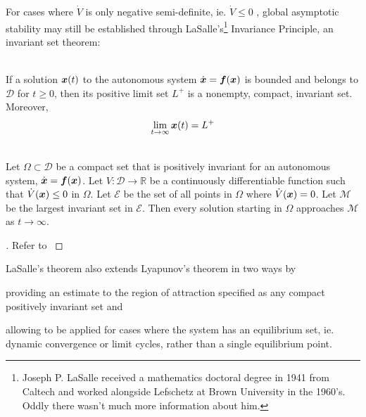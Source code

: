 \documentclass[12pt]{ucthesis}
\begin{document}
For cases where $\dot{V}$ is only negative semi-definite, ie. $\dot{V}\leq 0$ , global asymptotic stability may still be established through LaSalle's\footnote{Joseph P. LaSalle received a mathematics doctoral degree in 1941 from Caltech and worked alongside Lefschetz at Brown University in the 1960's. Oddly there wasn't much more information about him.} Invariance Principle, an invariant set theorem: 

\begin{lem} \alignright \citet[Lem. 3.1]{Khalil1996}\\
	If a solution $\boldsymbol{x}(t)$ to the autonomous system $\dot{\boldsymbol{x}} =  \boldsymbol{f}(\boldsymbol{x})$ is bounded and belongs to $\mathcal{D}$ for $t \geq 0$, then its positive limit set ${L}^+$ is a nonempty, compact, invariant set. Moreover,
	\begin{equation}
		\lim_{t \rightarrow \infty} \boldsymbol{x}(t) = {L}^+
		\label{lem: limit_set_conv}
	\end{equation}
\end{lem}

\begin{thm} \alignright \citet[Thm. 3.4]{Khalil1996} \label{thm: lasalle}\\
	Let $\Omega \subset \mathcal{D}$ be a compact set that is positively invariant for an autonomous system, $\dot{\boldsymbol{x}} =  \boldsymbol{f}(\boldsymbol{x})$. Let $V: \mathcal{D} \rightarrow \mathbb{R}$ be a continuously differentiable function such that $\dot{V}(\boldsymbol{x}) \leq 0$ in $\Omega$. Let $\mathcal{E}$ be the set of all points in $\Omega$ where $\dot{V}(\boldsymbol{x})=0$. Let $\mathcal{M}$ be the largest invariant set in $\mathcal{E}$. Then every solution starting in $\Omega$ approaches $\mathcal{M}$ as $t \rightarrow \infty$.
\end{thm}

\begin{proof}[]
	Refer to \citet[Pg. 115]{Khalil1996}
\end{proof}

LaSalle's theorem also extends Lyapunov's theorem in two ways by \begin{inparaenum} \item{providing an estimate to the region of attraction specified as any compact positively invariant set and} \item{allowing  to be applied for cases where the system has an equilibrium set, ie. dynamic convergence or limit cycles, rather than a single equilibrium point.} \end{inparaenum}
\end{document}
